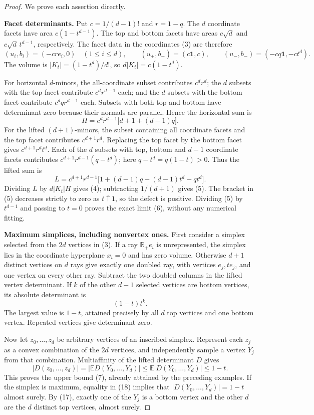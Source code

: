 \documentclass[11pt]{article}
\begin{document}
\begin{proof}
We prove each assertion directly.

\medskip\noindent\textbf{Facet determinants.}
Put $c=1/(d-1)!$ and $r=1-q$. The $d$ coordinate facets have area
$c(1-t^{d-1})$. The top and bottom facets have areas $c\sqrt d$ and
$c\sqrt d\,t^{d-1}$, respectively. The facet data in the coordinates (3) are
therefore
\[
 (u_i,b_i)=(-cr e_i,0)\quad(1\le i\le d),\qquad
 (u_+,b_+)=(c\mathbf1,c),\qquad
 (u_-,b_-)=(-cq\mathbf1,-ct^d).
 \tag{14}
\]
The volume is $|K_t|=(1-t^d)/d!$, so $d|K_t|=c(1-t^d)$.

For horizontal $d$-minors, the all-coordinate subset contributes $c^d r^d$;
the $d$ subsets with the top facet contribute $c^d r^{d-1}$ each; and the
$d$ subsets with the bottom facet contribute $c^d q r^{d-1}$ each.
Subsets with both top and bottom have determinant zero because their normals
are parallel. Hence the horizontal sum is
\[
 H=c^d r^{d-1}\bigl[d+1+(d-1)q\bigr].
 \tag{15}
\]
For the lifted $(d+1)$-minors, the subset containing all coordinate facets
and the top facet contributes $c^{d+1}r^d$. Replacing the top facet by the
bottom facet gives $c^{d+1}r^dt^d$. Each of the $d$ subsets with top, bottom and $d-1$
coordinate facets contributes
$c^{d+1}r^{d-1}(q-t^d)$; here $q-t^d=q(1-t)>0$.
Thus the lifted sum is
\[
 L=c^{d+1}r^{d-1}
   \bigl[1+(d-1)q-(d-1)t^d-qt^d\bigr].
 \tag{16}
\]
Dividing $L$ by $d|K_t|H$ gives (4); subtracting $1/(d+1)$ gives (5).
The bracket in (5) decreases strictly to zero as $t\uparrow1$, so the defect
is positive. Dividing (5) by $t^{d-1}$ and passing to $t=0$ proves the exact
limit (6), without any numerical fitting.

\medskip\noindent\textbf{Maximum simplices, including nonvertex ones.}
First consider a simplex selected from the $2d$ vertices in (3). If a ray
$\mathbb R_+e_i$ is unrepresented, the simplex lies in the coordinate
hyperplane $x_i=0$ and has zero volume. Otherwise $d+1$ distinct vertices
on $d$ rays give exactly one doubled ray, with vertices $e_j,te_j$, and one
vertex on every other ray. Subtract the two doubled columns in the lifted
vertex determinant. If $k$ of the other $d-1$ selected vertices are bottom
vertices, its absolute determinant is
\[
 (1-t)t^k.
 \tag{17}
\]
The largest value is $1-t$, attained precisely by all $d$ top vertices and
one bottom vertex. Repeated vertices give determinant zero.

Now let $z_0,\ldots,z_d$ be arbitrary vertices of an inscribed simplex.
Represent each $z_j$ as a convex combination of the $2d$ vertices, and
independently sample a vertex $Y_j$ from that combination. Multiaffinity of
the lifted determinant $D$ gives
\[
 |D(z_0,\ldots,z_d)|
 =|\mathbb E D(Y_0,\ldots,Y_d)|
 \le\mathbb E|D(Y_0,\ldots,Y_d)|\le1-t.
 \tag{18}
\]
This proves the upper bound (7), already attained by the preceding examples.
If the simplex is maximum, equality in (18) implies that
$|D(Y_0,\ldots,Y_d)|=1-t$ almost surely. By (17), exactly one of the $Y_j$
is a bottom vertex and the other $d$ are the $d$ distinct top vertices,
almost surely.


\end{proof}
\end{document}
